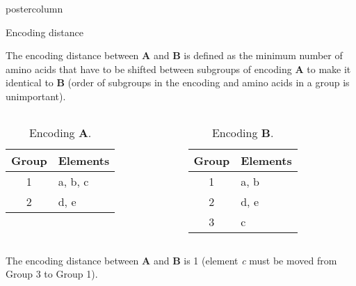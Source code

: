 \documentclass[final]{beamer}\usepackage[]{graphicx}\usepackage[]{color}
\begin{document}
\begin{frame}
\begin{columns}
\begin{column}{.50\textwidth}
\begin{beamercolorbox}[center,wd=\textwidth]{postercolumn}
\begin{minipage}[T]{.95\textwidth}
{\begin{block}{Encoding distance}

The encoding distance between \textbf{A} and \textbf{B} is defined as the minimum number of amino acids that have to be shifted between subgroups of encoding \textbf{A} to make it identical to \textbf{B} (order of subgroups in the encoding and amino acids in a group is unimportant).

\begin{columns}
\begin{table}[ht]
\centering
\begin{tabular}{c|l}
  \toprule
Group & Elements \\ 
  \midrule
1 & a, b, c \\ 
   \rowcolor[gray]{0.75}2 & d, e \\ 
   \bottomrule
\end{tabular}
\caption{Encoding \textbf{A}.} 
\end{table}


\begin{table}[ht]
\centering
\begin{tabular}{c|l}
  \toprule
Group & Elements \\ 
  \midrule
1 & a, b \\ 
   \rowcolor[gray]{0.75}2 & d, e \\ 
  3 & c \\ 
   \bottomrule
\end{tabular}
\caption{Encoding \textbf{B}.} 
\end{table}

\end{columns}

The encoding distance between \textbf{A} and \textbf{B} is 1 (element \textit{c} must be moved from Group 3 to Group 1).

\end{block}
\vfill



}
\end{minipage}
\end{beamercolorbox}
\end{column}




\end{columns}
\end{frame}
\end{document}
